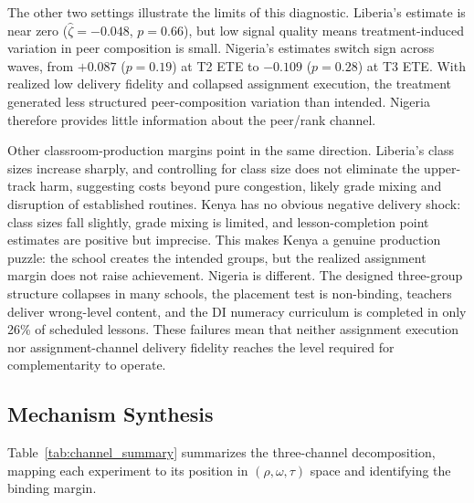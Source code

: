 \documentclass[11pt]{article}
\begin{document}
The other two settings illustrate the limits of this diagnostic. Liberia's estimate is near zero ($\hat{\zeta}=-0.048$, $p=0.66$), but low signal quality means treatment-induced variation in peer composition is small. Nigeria's estimates switch sign across waves, from $+0.087$ ($p=0.19$) at T2 ETE to $-0.109$ ($p=0.28$) at T3 ETE. With realized low delivery fidelity and collapsed assignment execution, the treatment generated less structured peer-composition variation than intended. Nigeria therefore provides little information about the peer/rank channel.

Other classroom-production margins point in the same direction. Liberia's class sizes increase sharply, and controlling for class size does not eliminate the upper-track harm, suggesting costs beyond pure congestion, likely grade mixing and disruption of established routines. Kenya has no obvious negative delivery shock: class sizes fall slightly, grade mixing is limited, and lesson-completion point estimates are positive but imprecise. This makes Kenya a genuine production puzzle: the school creates the intended groups, but the realized assignment margin does not raise achievement. Nigeria is different. The designed three-group structure collapses in many schools, the placement test is non-binding, teachers deliver wrong-level content, and the DI numeracy curriculum is completed in only 26\% of scheduled lessons. These failures mean that neither assignment execution nor assignment-channel delivery fidelity reaches the level required for complementarity to operate.

\subsection{Mechanism Synthesis}

Table~\ref{tab:channel_summary} summarizes the three-channel decomposition, mapping each experiment to its position in $(\rho, \omega, \tau)$ space and identifying the binding margin.
\end{document}
